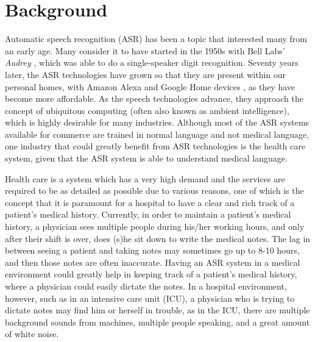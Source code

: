 

\section{Background}

Automatic speech recognition (ASR) has been a topic that interested many from an early age. Many consider it to have started in the 1950s with Bell Labs' \textit{Audrey} \cite{voicerecog_history}, which was able to do a single-speaker digit recognition. Seventy years later, the ASR technologies have grown so that they are present within our personal homes, with Amazon Alexa and Google Home devices \cite{asr_at_home}, as they have become more affordable. As the speech technologies advance, they approach the concept of ubiquitous computing (often also known as ambient intelligence), which is highly desirable for many industries. Although most of the ASR systems available for commerce are trained in normal language and not medical language, one industry that could greatly benefit from ASR technologies is the health care system, given that the ASR system is able to understand medical language.

Health care is a system which has a very high demand and the services are required to be as detailed as possible due to various reasons, one of which is the concept that it is paramount for a hospital to have a clear and rich track of a patient's medical history. Currently, in order to maintain a patient's medical history, a physician sees multiple people during his/her working hours, and only after their shift is over, does (s)he sit down to write the medical notes. The lag in between seeing a patient and taking notes may sometimes go up to 8-10 hours, and then those notes are often inaccurate. Having an ASR system in a medical environment could greatly help in keeping track of a patient's medical history, where a physician could easily dictate the notes. In a hospital environment, however, such as in an intensive care unit (ICU), a physician who is trying to dictate notes may find him or herself in trouble, as in the ICU, there are multiple background sounds from machines, multiple people speaking, and a great amount of white noise.

